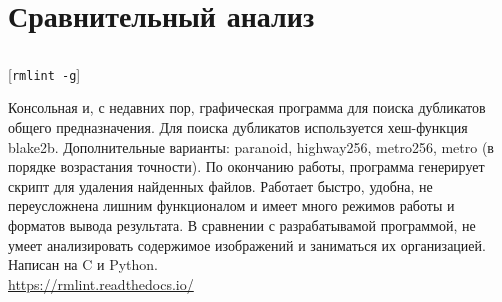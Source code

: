 \documentclass[variant=courcework]{bsuir}
\begin{document}


\section{Сравнительный анализ}

\subsection{}

[\texttt{rmlint -g}]

Консольная и, с недавних пор, графическая программа для поиска дубликатов общего
предназначения. Для поиска дубликатов используется хеш-функция blake2b.
Дополнительные варианты: paranoid, highway256, metro256, metro (в порядке
возрастания точности). По окончанию работы, программа генерирует скрипт для
удаления найденных файлов. Работает быстро, удобна, не переусложнена лишним
функционалом и имеет много режимов работы и форматов вывода результата. В
сравнении с разрабатывамой программой, не умеет анализировать содержимое
изображений и заниматься их организацией. Написан на C и Python.\\

\url{https://rmlint.readthedocs.io/}
\end{document}
